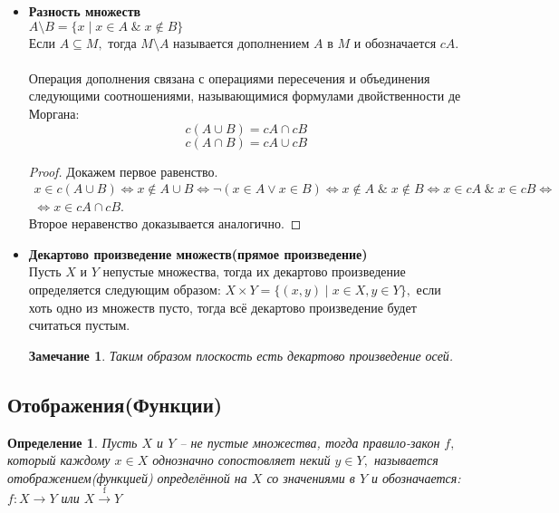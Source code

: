 \documentclass{article}
\newtheorem{Remark}{Замечание}[section]
\newtheorem{Definition}{Определение}[section]
\begin{document}
\begin{itemize}
\item {\bf Разность множеств}
\\$A\setminus B = \{x\mid x\in A \;\&\; x\notin B\}$
\\Если $A\subseteq M,$ тогда $M\setminus A$ называется дополнением $A$ в $M$ и обозначается $cA.$\\
\\Операция дополнения связана с операциями пересечения и объединения следующими соотношениями, называющимися формулами двойственности де Моргана: 
$$c\left(A\cup B\right)=cA\cap cB$$
$$c\left(A\cap B\right)=cA\cup cB$$

\begin{proof}
Докажем первое равенство. 
\begin{eqnarray}
x\in c\left(A\cup B\right) \Leftrightarrow x\notin A\cup B \Leftrightarrow \neg\left(x\in A \vee x\in B\right) \Leftrightarrow x\notin A \;\&\; x\notin B \Leftrightarrow x\in cA \;\&\; x\in cB \Leftrightarrow \nonumber \\ 
\Leftrightarrow x\in cA\cap cB.\nonumber
\end{eqnarray}
Второе неравенство доказывается аналогично.
\end{proof}

\item {\bf Декартово произведение множеств(прямое произведение)}
\\Пусть $X$ и $Y$ непустые множества, тогда их декартово произведение определяется следующим образом: $X\times Y = \{(x,y)\mid x\in X, y\in Y\},$ если хоть одно из множеств пусто, тогда всё декартово произведение будет считаться пустым.

\begin{Remark}
Таким образом плоскость есть декартово произведение осей.
\end{Remark}
\end{itemize}

\subsection{Отображения(Функции)}

\begin{Definition}
Пусть $X$ и $Y$ -- не пустые множества, тогда правило-закон $f,$ который каждому $x\in X$ однозначно сопостовляет некий $y\in Y,$ называется отображением(функцией) определённой на $X$ со значениями в $Y$ и обозначается: $f:X \rightarrow Y$ или $X \xrightarrow{\text{f}}Y$
\end{Definition}
\end{document}
